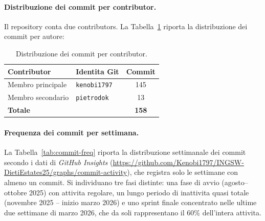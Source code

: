 \documentclass[a4paper,11pt]{article}
\begin{document}
\paragraph{Distribuzione dei commit per contributor.}
Il repository conta due contributors. La Tabella~\ref{tab:contributors} riporta la distribuzione dei commit per autore:

\begin{table}[H]
\centering
\begin{tabular}{@{}l l c@{}}
\toprule
Contributor & Identita Git & Commit \\
\midrule
Membro principale & \texttt{kenobi1797} & 145 \\
Membro secondario & \texttt{pietrodok} & 13 \\
\midrule
\textbf{Totale} & & \textbf{158} \\
\bottomrule
\end{tabular}
\caption{Distribuzione dei commit per contributor.}
\label{tab:contributors}
\end{table}

\paragraph{Frequenza dei commit per settimana.}
La Tabella~\ref{tab:commit-freq} riporta la distribuzione settimanale dei commit secondo i dati di \emph{GitHub Insights} (\url{https://github.com/Kenobi1797/INGSW-DietiEstates25/graphs/commit-activity}), che registra solo le settimane con almeno un commit. Si individuano tre fasi distinte: una fase di avvio (agosto--ottobre 2025) con attivita regolare, un lungo periodo di inattivita quasi totale (novembre 2025 -- inizio marzo 2026) e uno sprint finale concentrato nelle ultime due settimane di marzo 2026, che da soli rappresentano il 60\% dell'intera attivita.
\end{document}
